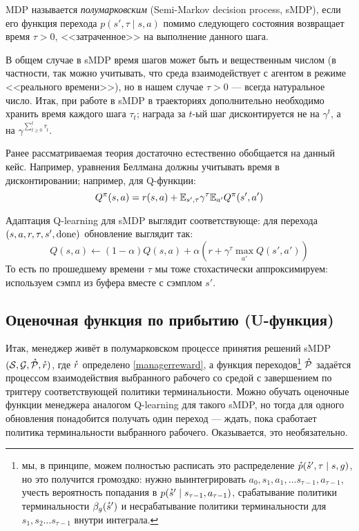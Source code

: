 \begin{definition}
MDP называется \emph{полумарковским} (Semi-Markov decision process, sMDP), если его функция перехода $p(s', \tau \mid s, a)$ помимо следующего состояния возвращает время $\tau > 0$, <<затраченное>> на выполнение данного шага. 
\end{definition}

В общем случае в sMDP время шагов может быть и вещественным числом (в частности, так можно учитывать, что среда взаимодействует с агентом в режиме <<реального времени>>), но в нашем случае $\tau > 0$ --- всегда натуральное число. Итак, при работе в sMDP в траекториях дополнительно необходимо хранить время каждого шага $\tau_t$; награда за $t$-ый шаг дисконтируется не на $\gamma^t$, а на $\gamma^{\sum_{\hat{t} \ge 0}^t \tau_{\hat{t}}}$.

Ранее рассматриваемая теория достаточно естественно обобщается на данный кейс. Например, уравнения Беллмана должны учитывать время в дисконтировании; например, для Q-функции:
$$Q^\pi(s, a) = r(s, a) + \mathbb{E}_{s', \tau} \gamma^\tau \mathbb{E}_{a'} Q^\pi(s', a')$$

Адаптация Q-learning для sMDP выглядит соответствующе: для перехода $(s, a, r, \tau, s', \mathrm{done})$ обновление выглядит так:
$$Q(s, a) \leftarrow (1 - \alpha) Q(s, a) + \alpha \left(r + \gamma^\tau \max_{a'} Q(s', a') \right)$$
То есть по прошедшему времени $\tau$ мы тоже стохастически аппроксимируем: используем сэмпл из буфера вместе с сэмплом $s'$.

\subsection{Оценочная функция по прибытию (U-функция)}

Итак, менеджер живёт в полумарковском процессе принятия решений sMDP $(\mathcal{S}, \mathcal{G}, \accentset{\star}{\mathcal{P}}, \accentset{\star}{r})$, где $\accentset{\star}{r}$ определено \eqref{managerreward}, а функция переходов\footnote{мы, в принципе, можем полностью расписать это распределение $\accentset{\star}{p}(\accentset{\star}{s}', \tau \mid s, g)$, но это получится громоздко: нужно выинтегрировать $a_0, s_1, a_1, \dots s_{\tau - 1}, a_{\tau - 1}$, учесть вероятность попадания в $p(\accentset{\star}{s}' \mid s_{\tau - 1}, a_{\tau - 1})$, срабатывание политики терминальности $\beta_g(\accentset{\star}{s}')$ и несрабатывание политики терминальности для $s_1, s_2 \dots s_{\tau - 1}$ внутри интеграла.} $\accentset{\star}{\mathcal{P}}$ задаётся процессом взаимодействия выбранного рабочего со средой с завершением по триггеру соответствующей политики терминальности. Можно обучать оценочные функции менеджера аналогом Q-learning для такого sMDP, но тогда для одного обновления понадобится получать один переход --- ждать, пока сработает политика терминальности выбранного рабочего. Оказывается, это необязательно. 

